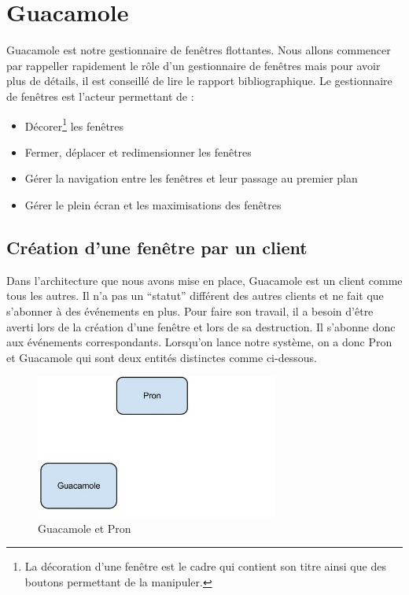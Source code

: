 \section{Guacamole}
\label{Guacamole}

Guacamole est notre gestionnaire de fenêtres flottantes.
Nous allons commencer par rappeller rapidement le rôle d'un gestionnaire de fenêtres mais pour avoir plus de détails, il est conseillé de lire le rapport bibliographique.
Le gestionnaire de fenêtres est l'acteur permettant de :

\begin{itemize}
  \item Décorer\footnote{La décoration d'une fenêtre est le cadre qui contient son titre ainsi que des boutons permettant de la manipuler.} les fenêtres
  \item Fermer, déplacer et redimensionner les fenêtres
  \item Gérer la navigation entre les fenêtres et leur passage au premier plan
  \item Gérer le plein écran et les maximisations des fenêtres
\end{itemize}

\subsection{Création d'une fenêtre par un client}

Dans l'architecture que nous avons mise en place, Guacamole est un client comme tous les autres.
Il n'a pas un ``statut'' différent des autres clients et ne fait que s'abonner à des événements en plus.
Pour faire son travail, il a besoin d'être averti lors de la création d'une fenêtre et lors de sa destruction.
Il s'abonne donc aux événements correspondants.
Lorsqu'on lance notre système, on a donc Pron et Guacamole qui sont deux entités distinctes comme ci-dessous.

\begin{figure}[H]
  \centering
  \includegraphics[width=8cm]{images/Guacamole_anim_1.jpg}
  \caption{Guacamole et Pron}
  \label{fig:guacamole_anim_1}
\end{figure}

